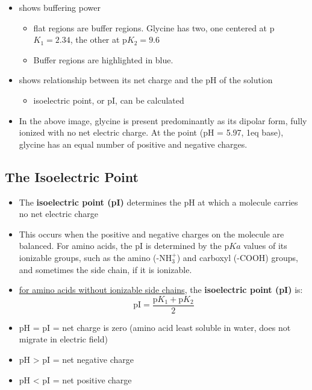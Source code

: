 \documentclass[10pt]{article}
\begin{document}
\begin{itemize}
    \item shows buffering power 
    \begin{itemize}
        \item flat regions are buffer regions. Glycine has two, one centered at p$K_1 = 2.34$, the other at p$K_2 = 9.6$
        \item Buffer regions are highlighted in blue.
    \end{itemize}
    \item shows relationship between its net charge and the pH of the solution
    \begin{itemize}
        \item isoelectric point, or pI, can be calculated
    \end{itemize}
    \item In the above image, glycine is present predominantly as its dipolar form, fully ionized with no net electric charge.  At the point (pH = 5.97, 1eq base), glycine has an equal number of positive and negative charges.
\end{itemize}
\subsection*{The Isoelectric Point}
\begin{itemize}
    \item The \textbf{isoelectric point (pI)} determines the pH at which a molecule carries no net electric charge
    \item This occurs when the positive and negative charges on the molecule are balanced.  For amino acids, the pI is determined by the p$Ka$ values of its ionizable groups, such as the amino (-NH$_3^+$) and carboxyl (-COOH) groups, and sometimes the side chain, if it is ionizable.
    \item \underline{for amino acids without ionizable side chains}, the \textbf{isoelectric point (pI)} is:
    \[\text{pI} = \frac{\text{p}K_1 + \text{p}K_2}{2}\]
    \item pH = pI = net charge is zero (amino acid least soluble in water, does not migrate in electric field)
    \item pH > pI = net negative charge
    \item pH < pI = net positive charge
\end{itemize}
\end{document}
